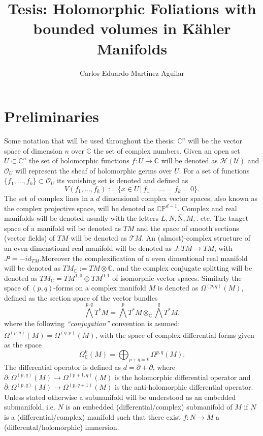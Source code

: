 \documentclass[letterpaper]{book}
\author{Carlos Eduardo Martinez Aguilar}
\title{Tesis: Holomorphic Foliations with bounded volumes in Kähler Manifolds}
\newcommand{\co}{\ensuremath{\mathbb C }}
\newcommand{\con}{\ensuremath{\mathbb{C}^n}}
\newcommand{\cp}{\ensuremath{\mathbb{CP}}}
\begin{document}
\maketitle
\tableofcontents
\newpage

\chapter{Preliminaries}
Some notation that will be used throughout the thesis: $\con$ will be the vector space of dimension $n$ over $\co$ the set of complex numbers. Given an open set $U\subset\con$ the set of holomorphic functions $f:U\rightarrow\co$ will be denoted as $\mathcal{H(U)}$ and $\mathcal{O}_{U}$ will represent the sheaf of holomorphic germs over $U$.
For a set of functions $\{f_{1},\dots,f_{k}\}\subset\mathcal{O}_{U}$ its vanishing set is denoted and defined as
\[
  V(f_{1},\dots,f_{k}):=\{x\in U\,\vert\,f_{1}=\dots =f_{k}=0\}.
\]
The set of complex lines in a $d$ dimensional complex vector spaces, also known as the complex projective space, will be denoted as $\cp^{d-1}$. Complex and real manifolds will be denoted usually with the letters $L, N, Ñ, M,$. etc. The tanget space of a manifold wil be denoted as $TM$ and the space of smooth sections (vector fields) of $TM$ will be denoted as $\mathcal{T}M$.
An (almost)-complex structure of an even dimenstional real manifold will be denoted as $J:TM\rightarrow TM$, with $J²=-id_{TM}$.Moreover the complexification of a even dimentional real manifold will be denoted as $TM_{\co}:=TM\otimes\co$, and the complex conjugate splitting will be denoted as $TM_{\co}=TM^{1,0}\oplus TM^{0,1}$ of isomorphic vector spaces.
Similarly the space of $(p,q)$-forms on a complex manifold $M$ is denoted as $\Omega^{(p,q)}(M)$, defined as the section space of the vector bundles
\[
  \bigwedge^{p,q}T^{*}M=\bigwedge^{p}T^{*}M\otimes_{\co}\bigwedge^{q}T^{*}M.
\]
\noindent where the following \emph{``conjugation''} convention is asumed: $\overline{\Omega^{(p,q)}(M)}=\Omega^{(q,p)}(M)$, with the space of complex differential forms given as the space
\[
  \Omega^{k}_{\co}(M)=\bigoplus_{p+q=k}\Omega^{p,q}(M).
\]
\noindent The differential operator is defined as $d=\partial + \overline{\partial}$, where $\partial:\Omega^{(p,q)}(M)\rightarrow \Omega^{(p+1,q)}(M)$ is the holomorphic differential operator and $\overline{\partial}:\Omega^{(p,q)}(M)\rightarrow\Omega^{(p,q+1)}(M)$ is the anti-holomorphic differential operator.\\
Unless stated otherwise a submanifold will be understood as an embedded submanifold, i.e. $N$ is an embedded (differential/complex) submanifold of $M$ if $N$ is a (differential/complex) manifold such that there exist $f:N\rightarrow M$ a (differental/holomorphic) immersion.
\end{document}
